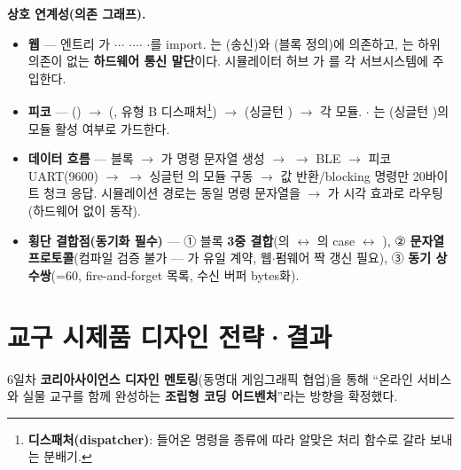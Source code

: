 \smallskip
\noindent\textbf{상호 연계성(의존 그래프).}
\begin{itemize}
  \item \textbf{웹} --- 엔트리 가 $\cdot$$\cdot$$\cdot$%
  $\cdot$$\cdot$$\cdot$$\cdot$%
  $\cdot$를 import. 는 (송신)와
  (블록 정의)에 의존하고, 는 하위 의존이 없는 \textbf{하드웨어
  통신 말단}이다. 시뮬레이터 허브 가 를 각 서브시스템에 주입한다.
  \item \textbf{피코} --- () $\to$ (,
  유형 B 디스패처\footnote{\textbf{디스패처(dispatcher)}: 들어온 명령을 종류에 따라 알맞은 처리 함수로 갈라 보내는 분배기.}) $\to$ (싱글턴 ) $\to$ 각 모듈. $\cdot$%
  는 (싱글턴 )의 모듈 활성 여부로 가드한다.
  \item \textbf{데이터 흐름} --- 블록 $\to$ 가 명령 문자열 생성 $\to$ 
  $\to$ BLE $\to$ 피코 UART(9600) $\to$  $\to$ 싱글턴 의 모듈 구동
  $\to$ 값 반환/blocking 명령만 20바이트 청크 응답. 시뮬레이션 경로는 동일 명령 문자열을
   $\to$ 가 시각 효과로 라우팅(하드웨어 없이 동작).
  \item \textbf{횡단 결합점(동기화 필수)} --- ① 블록 \textbf{3중 결합}(의 
  $\leftrightarrow$ 의 case $\leftrightarrow$ ), ② \textbf{문자열
  프로토콜}(컴파일 검증 불가 --- 가 유일 계약, 웹$\cdot$펌웨어 짝 갱신 필요),
  ③ \textbf{동기 상수쌍}(=60, fire-and-forget 목록, 수신 버퍼 bytes화).
\end{itemize}

\section{교구 시제품 디자인 전략·결과}
6일차 \textbf{코리아사이언스 디자인 멘토링}(동명대 게임그래픽 협업)을 통해 ``온라인 서비스와 실물
교구를 함께 완성하는 \textbf{조립형 코딩 어드벤처}''라는 방향을 확정했다.

